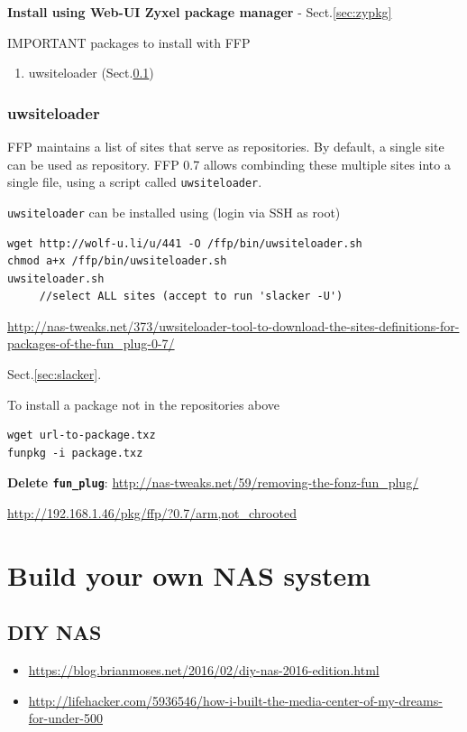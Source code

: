 {\bf Install using Web-UI Zyxel package manager} - Sect.\ref{sec:zypkg}


IMPORTANT packages to install with FFP
\begin{enumerate}
  \item uwsiteloader (Sect.\ref{sec:uwsiteloader})
\end{enumerate}

\subsection{uwsiteloader}
\label{sec:uwsiteloader}

FFP maintains a list of sites that serve as repositories. By default, a single
site can be used as repository. FFP 0.7 allows combinding these multiple sites
into a single file, using a script called \verb!uwsiteloader!.

\verb!uwsiteloader! can be installed using (login via SSH as root)
\begin{verbatim}
wget http://wolf-u.li/u/441 -O /ffp/bin/uwsiteloader.sh
chmod a+x /ffp/bin/uwsiteloader.sh
uwsiteloader.sh 
     //select ALL sites (accept to run 'slacker -U')
\end{verbatim}
\url{http://nas-tweaks.net/373/uwsiteloader-tool-to-download-the-sites-definitions-for-packages-of-the-fun_plug-0-7/}


Sect.\ref{sec:slacker}.


To install a package not in the repositories above
\begin{verbatim}
wget url-to-package.txz
funpkg -i package.txz 
\end{verbatim}
{\bf Delete \verb!fun_plug!}:
\url{http://nas-tweaks.net/59/removing-the-fonz-fun_plug/}

\url{http://192.168.1.46/pkg/ffp/?0.7/arm,not_chrooted}


\chapter{Build your own NAS system}
\label{chap:build_NAS}

\section{DIY NAS}
\label{sec:NAS-DIY}
\label{sec:DIY-NAS}

\begin{itemize}
  \item \url{https://blog.brianmoses.net/2016/02/diy-nas-2016-edition.html}
  
  \item
  \url{http://lifehacker.com/5936546/how-i-built-the-media-center-of-my-dreams-for-under-500}

\end{itemize}


